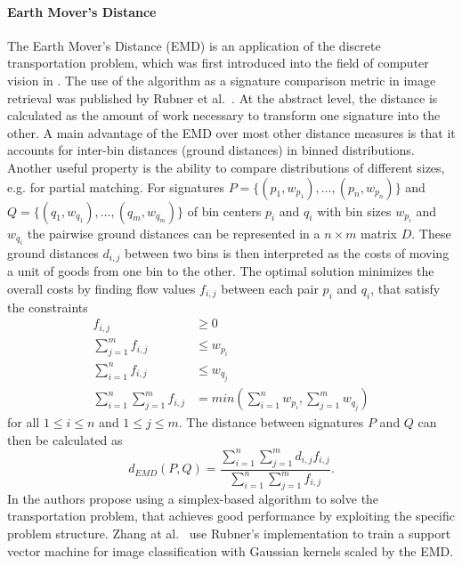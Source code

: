 \paragraph{Earth Mover's Distance}

The Earth Mover's Distance (EMD) is an application of the discrete
transportation problem, which was first introduced into the field of computer
vision in \autocite{peleg_unified_1989}. The use of the algorithm as a signature
comparison metric in image retrieval was published by Rubner et al.\
\autocite{rubner_metric_1998}. At the abstract level, the distance is calculated
as the amount of work necessary to transform one signature into the other.
A main advantage of the EMD over most other distance measures is that it
accounts for inter-bin distances (ground distances) in binned distributions.
Another useful property is the ability to compare distributions of different
sizes, e.g. for partial matching.
For signatures $P = \{ (p_1, w_{p_1}), \dots, (p_n, w_{p_n}) \}$ and $Q = \{
(q_1, w_{q_1}), \dots, (q_m, w_{q_m}) \}$ of bin centers $p_i$ and $q_i$ with
bin sizes $w_{p_i}$ and $w_{q_i}$ the pairwise ground distances can be
represented in a $n \times m$ matrix $D$.
These ground distances $d_{i, j}$ between two bins is then interpreted as the
costs of moving a unit of goods from one bin to the other. The optimal solution
minimizes the overall costs by finding flow values $f_{i, j}$ between each pair
$p_i$ and $q_i$, that satisfy the constraints
\begin{align*}
    f_{i, j} & \geq 0 \\
    \sum_{j=1}^m f_{i, j} & \leq w_{p_i} \\
    \sum_{i=1}^n f_{i, j} & \leq w_{q_j} \\
    \sum_{i=1}^n \sum_{j=1}^m f_{i, j} & = min \left( \sum_{i=1}^n w_{p_i}, \sum_{j=1}^m w_{q_j} \right)
\end{align*}
for all $1 \leq i \leq n$ and $1 \leq j \leq m$.
The distance between signatures $P$ and $Q$ can then be calculated as
\begin{equation*}
    d_{EMD}(P, Q) = \frac{\sum_{i=1}^n \sum_{j=1}^m d_{i, j} f_{i, j}}{\sum_{i=1}^n \sum_{j=1}^m f_{i, j}}.
\end{equation*}
In \autocite{rubner_metric_1998} the authors propose using a simplex-based
algorithm to solve the transportation problem, that achieves good performance
by exploiting the specific problem structure. Zhang at al.\
\autocite{zhang_local_2006} use Rubner's implementation to train a support
vector machine for image classification with Gaussian kernels scaled by the
EMD.

